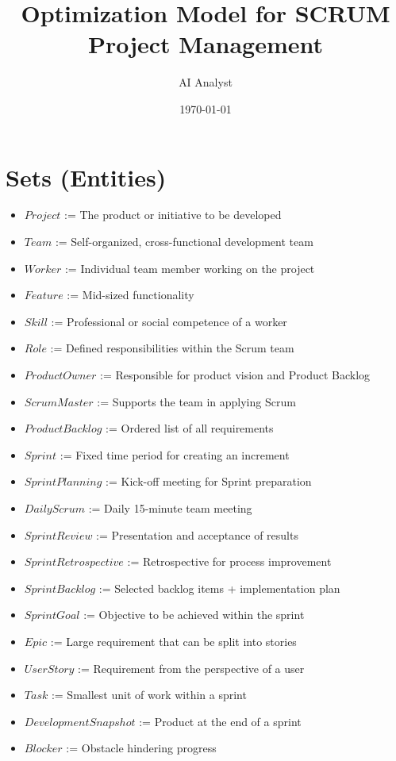 \documentclass{article}
\title{Optimization Model for SCRUM Project Management}
\author{AI Analyst}
\date{\today}
\begin{document}
\maketitle
\tableofcontents

\section{Sets (Entities)}
\begin{itemize}
    \item $Project$ := The product or initiative to be developed
    \item $Team$ := Self-organized, cross-functional development team
    \item $Worker$ := Individual team member working on the project
    \item $Feature$ := Mid-sized functionality
    \item $Skill$ := Professional or social competence of a worker
    \item $Role$ := Defined responsibilities within the Scrum team
    \item $ProductOwner$ := Responsible for product vision and Product Backlog
    \item $ScrumMaster$ := Supports the team in applying Scrum
    \item $ProductBacklog$ := Ordered list of all requirements
    \item $Sprint$ := Fixed time period for creating an increment
    \item $SprintPlanning$ := Kick-off meeting for Sprint preparation
    \item $DailyScrum$ := Daily 15-minute team meeting
    \item $SprintReview$ := Presentation and acceptance of results
    \item $SprintRetrospective$ := Retrospective for process improvement
    \item $SprintBacklog$ := Selected backlog items + implementation plan
    \item $SprintGoal$ := Objective to be achieved within the sprint
    \item $Epic$ := Large requirement that can be split into stories
    \item $UserStory$ := Requirement from the perspective of a user
    \item $Task$ := Smallest unit of work within a sprint
    \item $DevelopmentSnapshot$ := Product at the end of a sprint
    \item $Blocker$ := Obstacle hindering progress

\end{itemize}
\end{document}
